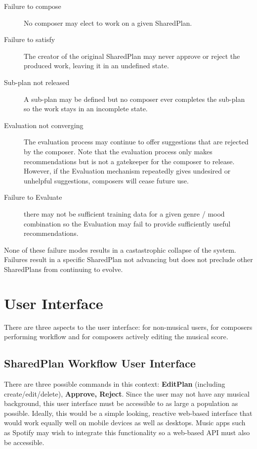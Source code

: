 \documentclass[final,authoryear,5p,times,twocolumn]{elsarticle}
\begin{document}
\begin{description}
\item[Failure to compose] No composer may elect to work on a given SharedPlan.
\item[Failure to satisfy] The creator of the original SharedPlan may never approve or reject the produced work, leaving it in an undefined state.
\item[Sub-plan not released]A sub-plan may be defined but no composer ever completes the sub-plan so the work stays in an incomplete state.
\item[Evaluation not converging] The evaluation process may continue to offer suggestions that are rejected by the composer. Note that the evaluation process only makes recommendations but is not a gatekeeper for the composer to release. However, if the Evaluation mechanism repeatedly gives undesired or unhelpful suggestions, composers will cease future use.
\item[Failure to Evaluate] there may not be sufficient training data for a given genre / mood combination so the Evaluation may fail to provide sufficiently useful recommendations.
\end{description}

None of these failure modes results in a castastrophic collapse of the system. Failures result in a specific SharedPlan not advancing but does not preclude other SharedPlans from continuing to evolve.

\section{User Interface}

There are three aspects to the user interface: for non-musical users, for composers performing workflow and for composers actively editing the musical score.

\subsection{SharedPlan Workflow User Interface}

There are three possible commands in this context: \textbf{EditPlan} (including create/edit/delete), \textbf{Approve, Reject}. Since the user may not have any musical background, this user interface must be accessible to as large a population as possible. Ideally, this would be a simple looking, reactive web-based interface that would work equally well on mobile devices as well as desktops. Music apps such as Spotify may wish to integrate this functionality so a web-based API must also be accessible.
\end{document}
